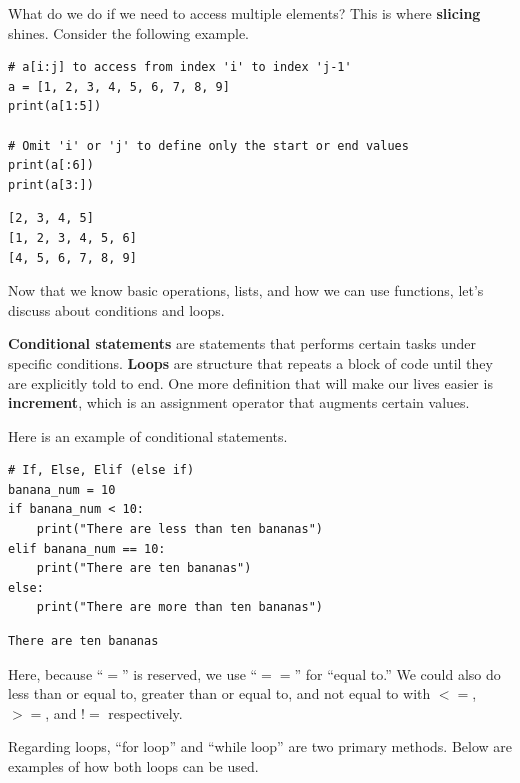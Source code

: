 \documentclass[../../main.tex]{subfiles}
\begin{document}
What do we do if we need to access multiple elements? This is
where \textbf{slicing} shines. Consider the following example.

\begin{jupyter}
\begin{lstlisting}[style=jin]
# a[i:j] to access from index 'i' to index 'j-1'
a = [1, 2, 3, 4, 5, 6, 7, 8, 9]
print(a[1:5])

# Omit 'i' or 'j' to define only the start or end values
print(a[:6])
print(a[3:])
\end{lstlisting}

\begin{lstlisting}[style=jout]
[2, 3, 4, 5]
[1, 2, 3, 4, 5, 6]
[4, 5, 6, 7, 8, 9]
\end{lstlisting}
\end{jupyter}

Now that we know basic operations, lists, and how we can use
functions, let's discuss about conditions and loops.

\begin{definition}{}{}
\textbf{Conditional statements} are statements that performs
certain tasks under specific conditions. \textbf{Loops} are
structure that repeats a block of code until they are explicitly
told to end. One more definition that will make our lives easier is
\textbf{increment}, which is an assignment operator that augments
certain values.
\end{definition}

Here is an example of conditional statements.

\begin{jupyter}
\begin{lstlisting}[style=jin]
# If, Else, Elif (else if)
banana_num = 10
if banana_num < 10:
    print("There are less than ten bananas")
elif banana_num == 10:
    print("There are ten bananas")
else:
    print("There are more than ten bananas")
\end{lstlisting}

\begin{lstlisting}[style=jout]
There are ten bananas
\end{lstlisting}
\end{jupyter}

Here, because ``$=$'' is reserved, we use ``$==$'' for ``equal to.''
We could also do less than or equal to, greater than or equal to,
and not equal to with $<=$, $>=$, and $!=$ respectively.

Regarding loops, ``for loop'' and ``while loop'' are two primary
methods. Below are examples of how both loops can be used.
\end{document}
